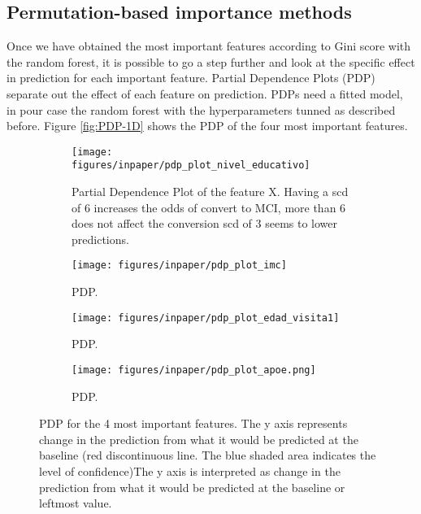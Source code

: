 \documentclass[preprint,12pt]{elsarticle}
\begin{document}
\subsection{Permutation-based importance methods}
Once we have obtained the most important features according to Gini score with the random forest, it is possible to go a step further and look at the specific effect in prediction for each important feature. 
Partial Dependence Plots (PDP) separate out the effect of each feature on prediction. PDPs need a fitted model, in pour case the random forest with the hyperparameters tunned as described before. Figure \ref{fig:PDP-1D} shows the PDP of the four most important features. 

\begin{figure}[]
    \centering
    \begin{subfigure}[t]{0.49\textwidth}
        \centering
        \texttt{[image: figures/inpaper/pdp\_plot\_nivel\_educativo]}
        \caption{Partial Dependence Plot of the feature X. Having a scd of 6 increases the odds of convert to MCI, more than 6 does not affect the conversion scd of 3 seems to lower predictions.}
    \end{subfigure}
    \hfill
    \begin{subfigure}[t]{0.49\textwidth}
        \centering
        \texttt{[image: figures/inpaper/pdp\_plot\_imc]}
        \caption{PDP.}
    \end{subfigure}%

    \begin{subfigure}[t]{0.49\textwidth}
        \centering
        \texttt{[image: figures/inpaper/pdp\_plot\_edad\_visita1]}
        \caption{PDP.}
    \end{subfigure}
    \hfill
    \begin{subfigure}[t]{0.49\textwidth}
        \centering
        \texttt{[image: figures/inpaper/pdp\_plot\_apoe.png]}
        \caption{PDP.}
    \end{subfigure}%
    \caption{PDP for the 4 most important features. The y axis represents change in the prediction from what it would be predicted at the baseline (red discontinuous line. The blue shaded area indicates the level of confidence)The y axis is interpreted as change in the prediction from what it would be predicted at the baseline or leftmost value.
    }
\end{figure}
\end{document}
